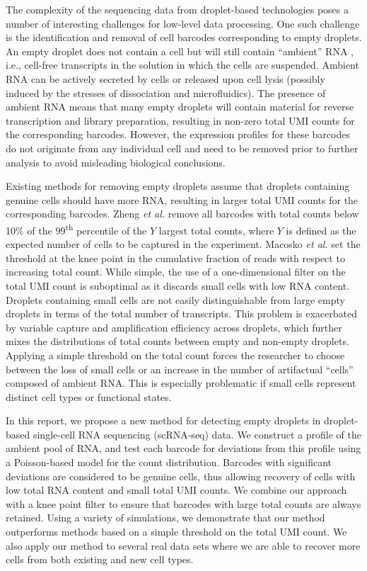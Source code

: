 \documentclass[10pt,letterpaper]{article}
\begin{document}
The complexity of the sequencing data from droplet-based technologies poses a number of interesting challenges for low-level data processing.
One such challenge is the identification and removal of cell barcodes corresponding to empty droplets.
An empty droplet does not contain a cell but will still contain ``ambient'' RNA \cite{macosko2015highly}, i.e., cell-free transcripts in the solution in which the cells are suspended.
Ambient RNA can be actively secreted by cells or released upon cell lysis (possibly induced by the stresses of dissociation and microfluidics).
The presence of ambient RNA means that many empty droplets will contain material for reverse transcription and library preparation, resulting in non-zero total UMI counts for the corresponding barcodes.
However, the expression profiles for these barcodes do not originate from any individual cell and need to be removed prior to further analysis to avoid misleading biological conclusions.

Existing methods for removing empty droplets assume that droplets containing genuine cells should have more RNA, resulting in larger total UMI counts for the corresponding barcodes.
Zheng \textit{et al.} \cite{zheng2017massively} remove all barcodes with total counts below 10\% of the 99\textsuperscript{th} percentile of the $Y$ largest total counts, where $Y$ is defined as the expected number of cells to be captured in the experiment.
Macosko \textit{et al.} \cite{macosko2015highly} set the threshold at the knee point in the cumulative fraction of reads with respect to increasing total count.
While simple, the use of a one-dimensional filter on the total UMI count is suboptimal as it discards small cells with low RNA content.
Droplets containing small cells are not easily distinguishable from large empty droplets in terms of the total number of transcripts.
This problem is exacerbated by variable capture and amplification efficiency across droplets, which further mixes the distributions of total counts between empty and non-empty droplets.
Applying a simple threshold on the total count forces the researcher to choose between the loss of small cells or an increase in the number of artifactual ``cells'' composed of ambient RNA.
This is especially problematic if small cells represent distinct cell types or functional states.

In this report, we propose a new method for detecting empty droplets in droplet-based single-cell RNA sequencing (scRNA-seq) data.
We construct a profile of the ambient pool of RNA, and test each barcode for deviations from this profile using a Poisson-based model for the count distribution.
Barcodes with significant deviations are considered to be genuine cells, thus allowing recovery of cells with low total RNA content and small total UMI counts.
We combine our approach with a knee point filter to ensure that barcodes with large total counts are always retained.
Using a variety of simulations, we demonstrate that our method outperforms methods based on a simple threshold on the total UMI count.
We also apply our method to several real data sets where we are able to recover more cells from both existing and new cell types.
\end{document}
